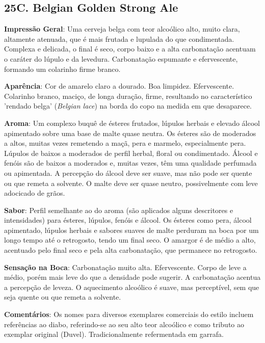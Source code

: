 \subsection*{25C. Belgian Golden Strong Ale}

\textbf{Impressão Geral}: Uma cerveja belga com teor alcoólico alto, muito clara, altamente atenuada, que é mais frutada e lupulada do que condimentada. Complexa e delicada, o final é seco, corpo baixo e a alta carbonatação acentuam o caráter do lúpulo e da levedura. Carbonatação espumante e efervescente, formando um colarinho firme branco.

\textbf{Aparência}: Cor de amarelo claro a dourado. Boa limpidez. Efervescente. Colarinho branco, maciço, de longa duração, firme, resultando no característico 'rendado belga' (\textit{Belgian lace}) na borda do copo na medida em que desaparece.

\textbf{Aroma}: Um complexo buquê de ésteres frutados, lúpulos herbais e elevado álcool apimentado sobre uma base de malte quase neutra. Os ésteres são de moderados a altos, muitas vezes remetendo a maçã, pera e marmelo, especialmente pera. Lúpulos de baixos a moderados de perfil herbal, floral ou condimentado. Álcool e fenóis são de baixos a moderados e, muitas vezes, têm uma qualidade perfumada ou apimentada. A percepção do álcool deve ser suave, mas não pode ser quente ou que remeta a solvente. O malte deve ser quase neutro, possivelmente com leve adocicado de grãos.

\textbf{Sabor}: Perfil semelhante ao do aroma (são aplicados alguns descritores e intensidades) para ésteres, lúpulos, fenóis e álcool. Os ésteres como pera, álcool apimentado, lúpulos herbais e sabores suaves de malte perduram na boca por um longo tempo até o retrogosto, tendo um final seco. O amargor é de médio a alto, acentuado pelo final seco e pela alta carbonatação, que permanece no retrogosto.

\textbf{Sensação na Boca}: Carbonatação muito alta. Efervescente. Corpo de leve a médio, porém mais leve do que a densidade pode sugerir. A carbonatação acentua a percepção de leveza. O aquecimento alcoólico é suave, mas perceptível, sem que seja quente ou que remeta a solvente.

\textbf{Comentários}: Os nomes para diversos exemplares comerciais do estilo incluem referências ao diabo, referindo-se ao seu alto teor alcoólico e como tributo ao exemplar original (Duvel). Tradicionalmente refermentada em garrafa.

